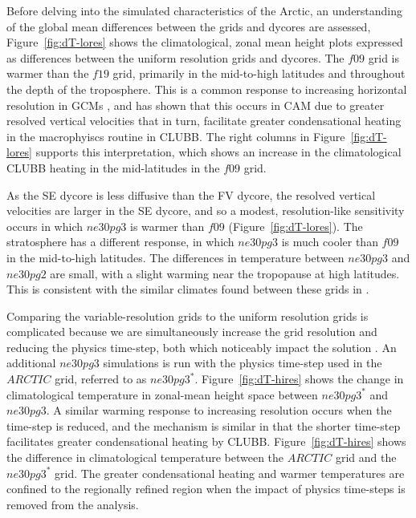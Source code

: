 \documentclass[draft]{agujournal2019}
\begin{document}
Before delving into the simulated characteristics of the Arctic, an understanding of the global mean differences between the grids and dycores are assessed, Figure~\ref{fig:dT-lores} shows the climatological, zonal mean height plots expressed as differences between the uniform resolution grids and dycores. The $f09$ grid is warmer than the $f19$ grid, primarily in the mid-to-high latitudes and throughout the depth of the troposphere. This is a common response to increasing horizontal resolution in GCMs \cite{PS2002CD,RETAL2006JC}, and \cite{HK2020QJRMS} has shown that this occurs in CAM due to greater resolved vertical velocities that in turn, facilitate greater condensational heating in the macrophyiscs routine in CLUBB. The right columns in Figure~\ref{fig:dT-lores} supports this interpretation, which shows an increase in the climatological CLUBB heating in the mid-latitudes in the $f09$ grid. 

As the SE dycore is less diffusive than the FV dycore, the resolved vertical velocities are larger in the SE dycore, and so a modest, resolution-like sensitivity occurs in which $ne30pg3$ is warmer than $f09$ (Figure~\ref{fig:dT-lores}). The stratosphere has a different response, in which $ne30pg3$ is much cooler than $f09$ in the mid-to-high latitudes. The differences in temperature between $ne30pg3$ and $ne30pg2$ are small, with a slight warming near the tropopause at high latitudes. This is consistent with the similar climates found between these grids in \cite{HETAL2019JAMES}.

Comparing the variable-resolution grids to the uniform resolution grids is complicated because we are simultaneously increase the grid resolution and reducing the physics time-step, both which noticeably impact the solution \cite{W2008TELLUS}. An additional $ne30pg3$ simulations is run with the physics time-step used in the $ARCTIC$ grid, referred to as $ne30pg3^{*}$. Figure~\ref{fig:dT-hires} shows the change in climatological temperature in zonal-mean height space between $ne30pg3^{*}$ and $ne30pg3$. A similar warming response to increasing resolution occurs when the time-step is reduced, and the mechanism is similar in that the shorter time-step facilitates greater condensational heating by CLUBB. Figure~\ref{fig:dT-hires} shows the difference in climatological temperature between the $ARCTIC$ grid and the $ne30pg3^{*}$ grid. The greater condensational heating and warmer temperatures are confined to the regionally refined region when the impact of physics time-steps is removed from the analysis.
\end{document}
